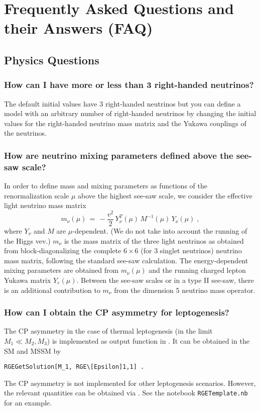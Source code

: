 \section{Frequently Asked Questions and their Answers (FAQ)}

\subsection{Physics Questions}

\subsubsection{How can I have more or less than 3 right-handed neutrinos?}

The default initial values have 3 right-handed neutrinos but you can define a
model with an arbitrary number of right-handed neutrinos by changing the initial
values for the right-handed neutrino mass matrix and the Yukawa couplings of the
neutrinos.

\subsubsection{How are neutrino mixing parameters defined above the
see-saw scale?}
In order to define mass and mixing parameters as functions of the
renormalization scale $\mu$ above the highest see-saw scale,
we consider the effective light neutrino mass matrix
\begin{equation} \label{eq:mnuFullTheory}
  m_\nu(\mu)\, =\, -\frac{v^2}{2} \, Y_\nu^T(\mu)\, M^{-1}(\mu)
\,Y_\nu(\mu) \;,
\end{equation}
where $Y_\nu$ and $M$ are $\mu$-dependent. (We do not take into account
the running of the Higgs vev.)
$m_\nu$ is the mass matrix of the three light neutrinos as obtained from
block-diagonalizing the complete $6\times6$ (for 3 singlet neutrinos) neutrino mass matrix,
following the standard see-saw calculation.
The energy-dependent mixing parameters are obtained from $m_\nu(\mu)$
and the running charged lepton Yukawa matrix $Y_e(\mu)$.
Between the see-saw scales or in a type II see-saw, there is an
additional contribution to $m_\nu$ from the dimension 5 neutrino mass
operator.

\subsubsection{How can I obtain the CP asymmetry for leptogenesis?}
The CP asymmetry in the case of thermal leptogenesis (in the limit $M_1 \ll
M_2,M_3$) is implemented as output
function in . It can be obtained in the SM and MSSM by
\begin{verbatim}
RGEGetSolution[M_1, RGE\[Epsilon]1,1] .
\end{verbatim}
The CP asymmetry is not implemented for other leptogenesis scenarios. However,
the relevant quantities can be obtained via . See the
notebook \texttt{RGETemplate.nb} for an example.

